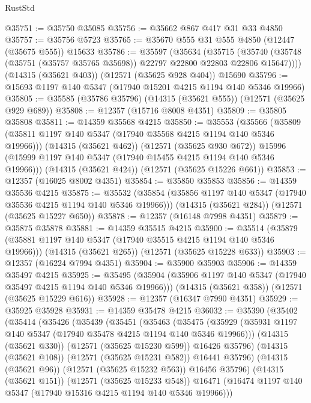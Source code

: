 \begin{lexlean}{RustStd}
\begin{coremodule}
@35751 := @35750 @35085
@35756 := @35662 @867 @417 @31 @33 @4850
@35757 := @35756 @5723
@35765 := @35670 @555 @31 @555 @4850 (@12447 (@35675 @555)) @15633
@35786 := @35597
    (@35634
      (@35715 (@35740 (@35748 (@35751 (@35757 @35765 @35698)) @22797 @22800 @22803 @22806 @15647))))
    (@14315 (@35621 @403))
    (@12571 (@35625 @928 @404))
    @15690
@35796 := @15693 @1197 @140 @5347 (@17940 @15201 @4215 @1194 @140 @5346 @19966)
@35805 := @35585 (@35786 @35796) (@14315 (@35621 @555)) (@12571 (@35625 @929 @689))
@35808 := @12357 (@15716 @8008 @4351)
@35809 := @35805 @35808
@35811 := @14359 @35568 @4215
@35850 := @35553
    (@35566
      (@35809 (@35811 @1197 @140 @5347 (@17940 @35568 @4215 @1194 @140 @5346 @19966)))
      (@14315 (@35621 @462))
      (@12571 (@35625 @930 @672))
      @15996
      (@15999 @1197 @140 @5347 (@17940 @15455 @4215 @1194 @140 @5346 @19966)))
    (@14315 (@35621 @424))
    (@12571 (@35625 @15226 @661))
@35853 := @12357 (@16025 @8002 @4351)
@35854 := @35850 @35853
@35856 := @14359 @35536 @4215
@35875 := @35532
    (@35854 (@35856 @1197 @140 @5347 (@17940 @35536 @4215 @1194 @140 @5346 @19966)))
    (@14315 (@35621 @284))
    (@12571 (@35625 @15227 @650))
@35878 := @12357 (@16148 @7998 @4351)
@35879 := @35875 @35878
@35881 := @14359 @35515 @4215
@35900 := @35514
    (@35879 (@35881 @1197 @140 @5347 (@17940 @35515 @4215 @1194 @140 @5346 @19966)))
    (@14315 (@35621 @265))
    (@12571 (@35625 @15228 @633))
@35903 := @12357 (@16224 @7994 @4351)
@35904 := @35900 @35903
@35906 := @14359 @35497 @4215
@35925 := @35495
    (@35904 (@35906 @1197 @140 @5347 (@17940 @35497 @4215 @1194 @140 @5346 @19966)))
    (@14315 (@35621 @358))
    (@12571 (@35625 @15229 @616))
@35928 := @12357 (@16347 @7990 @4351)
@35929 := @35925 @35928
@35931 := @14359 @35478 @4215
@36032 := @35390
    (@35402
      (@35414
        (@35426
          (@35439
            (@35451
              (@35463
                (@35475
                  (@35929 (@35931 @1197 @140 @5347 (@17940 @35478 @4215 @1194 @140 @5346 @19966)))
                  (@14315 (@35621 @330))
                  (@12571 (@35625 @15230 @599))
                  @16426
                  @35796)
                (@14315 (@35621 @108))
                (@12571 (@35625 @15231 @582))
                @16441
                @35796)
              (@14315 (@35621 @96))
              (@12571 (@35625 @15232 @563))
              @16456
              @35796)
            (@14315 (@35621 @151))
            (@12571 (@35625 @15233 @548))
            @16471
            (@16474 @1197 @140 @5347 (@17940 @15316 @4215 @1194 @140 @5346 @19966)))

\end{coremodule}
\end{lexlean}
